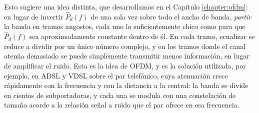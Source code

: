 
Esto sugiere una idea distinta, que desarrollamos en el Capítulo \ref{chapter:ofdm}: en lugar de invertir $\hat P_d(f)$ de una sola vez sobre todo el ancho de banda, \emph{partir} la banda en tramos angostos, cada uno lo suficientemente chico como para que $\hat P_d(f)$ sea aproximadamente constante dentro de él. En cada tramo, ecualizar se reduce a dividir por un único número complejo, y en los tramos donde el canal atenúa demasiado se puede simplemente transmitir menos información, en lugar de amplificar el ruido. Esta es la idea de OFDM, y es la solución utilizada, por ejemplo, en ADSL y VDSL sobre el par telefónico, cuya atenuación crece rápidamente con la frecuencia y con la distancia a la central: la banda se divide en cientos de subportadoras, y cada una se modula con una constelación de tamaño acorde a la relación señal a ruido que el par ofrece en esa frecuencia.


